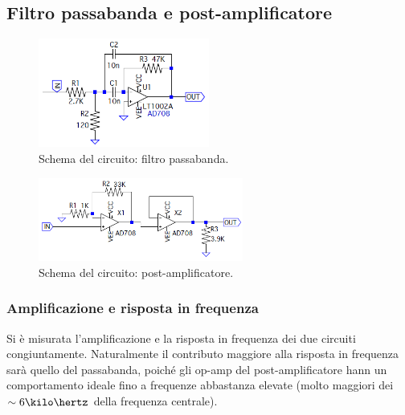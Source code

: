 \documentclass[a4paper,10pt]{article}
\begin{document}
\subsection{Filtro passabanda e post-amplificatore}

\begin{figure}
	\vspace{-10pt}
	\centering
	\includegraphics[width=0.5\textwidth]{../grafici/Bandpass.png}
	\vspace{-12pt}
	\caption{Schema del circuito: filtro passabanda.}
	\label{fig:powamp}
	\vspace{-6pt}
\end{figure}



\begin{figure}
	\vspace{-10pt}
	\centering
	\includegraphics[width=0.6\textwidth]{../grafici/PostAmp.png}
	\vspace{-12pt}
	\caption{Schema del circuito: post-amplificatore.}
	\label{fig:powamp}
	\vspace{-6pt}
\end{figure}




\subsubsection*{Amplificazione e risposta in frequenza}

Si è misurata l'amplificazione e la risposta in frequenza dei due circuiti congiuntamente. Naturalmente il contributo maggiore alla risposta in frequenza sarà quello del passabanda, poiché gli op-amp del post-amplificatore hann un comportamento ideale fino a frequenze abbastanza elevate (molto maggiori dei $\sim 6 \kilo\hertz $ della frequenza centrale).
\end{document}
